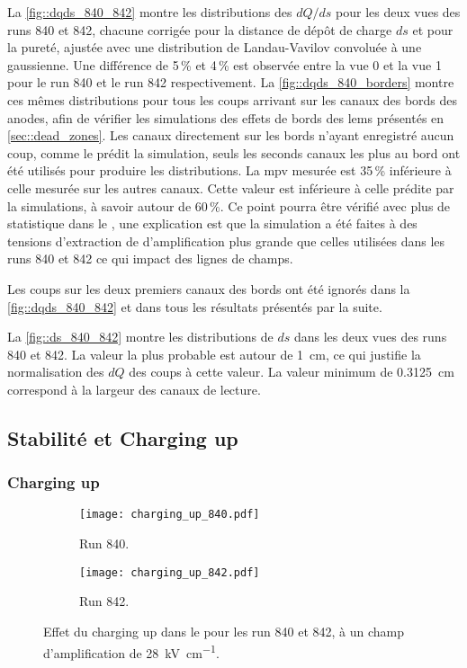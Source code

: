       La \autoref{fig::dqds_840_842} montre les distributions des $dQ/ds$ pour les deux vues des runs 840 et 842, chacune corrigée pour la distance de dépôt de charge $ds$ et pour la pureté, ajustée avec une distribution de Landau-Vavilov convoluée à une gaussienne. Une différence de 5\,\% et 4\,\% est observée entre la vue 0 et la vue 1 pour le run 840 et le run 842 respectivement. La \autoref{fig::dqds_840_borders} montre ces mêmes distributions pour tous les coups arrivant sur les  canaux des bords des anodes, afin de vérifier les simulations des effets de bords des \glspl{lem} présentés en \autoref{sec::dead_zones}. Les canaux directement sur les bords n'ayant enregistré aucun coup, comme le prédit la simulation, seuls les seconds canaux les plus au bord ont été utilisés pour produire les distributions. La \gls{mpv} mesurée est 35\,\% inférieure à celle mesurée sur les autres canaux. Cette valeur est inférieure à celle prédite par la simulations, à savoir autour de 60\,\%. Ce point pourra être vérifié avec plus de statistique dans le \SSS{}, une explication est que la simulation a été faites à des tensions d'extraction de d'amplification plus grande que celles utilisées dans les runs 840 et 842 ce qui impact des lignes de champs.

      Les coups sur les deux premiers canaux des bords ont été ignorés dans la \autoref{fig::dqds_840_842} et dans tous les résultats présentés par la suite.

      La \autoref{fig::ds_840_842} montre les distributions de $ds$ dans les deux vues des runs 840 et 842. La valeur la plus probable est autour de \SI{1}{\centi\meter}, ce qui justifie la normalisation des $dQ$ des coups à cette valeur. La valeur minimum de \SI{0.3125}{\centi\meter} correspond à la largeur des canaux de lecture.

    \subsection{Stabilité et Charging up}\label{sec::res-stab-cu}

      \subsubsection{Charging up}

        \begin{figure}[htbp]
        \centering
          \begin{subfigure}[t]{0.5\textwidth}
            \centering
            \texttt{[image: charging\_up\_840.pdf]}
            \caption{Run 840.}
          \end{subfigure}\hfill
          \begin{subfigure}[t]{0.5\textwidth}
            \centering
            \texttt{[image: charging\_up\_842.pdf]}
            \caption{Run 842.}
          \end{subfigure}
          \caption[Effet du charging up dans le \TOO{}]{\label{fig::charging_up_311}Effet du charging up dans le \TOO{} pour les run 840 et 842, à un champ d'amplification de \SI{28}{\kilo\volt\per\centi\meter}.}
        \end{figure}
        
